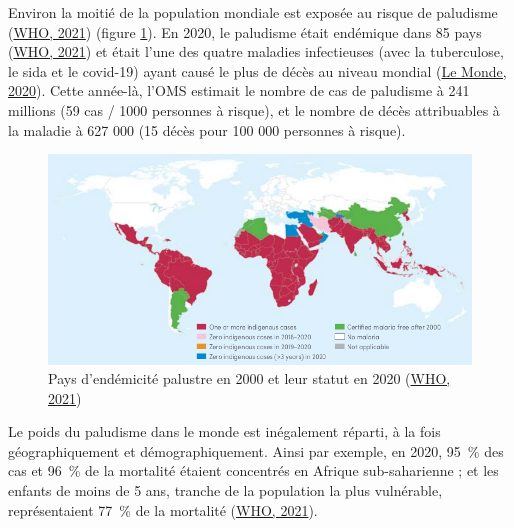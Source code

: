 \documentclass[12pt,twoside]{reedthesis}
\begin{document}
Environ la moitié de la population mondiale est exposée au risque de paludisme (\protect\hyperlink{ref-who_2021}{WHO, 2021}) (figure \ref{fig:map-global-malaria-countries}). En 2020, le paludisme était endémique dans 85 pays (\protect\hyperlink{ref-who_2021}{WHO, 2021}) et était l'une des quatre maladies infectieuses (avec la tuberculose, le sida et le covid-19) ayant causé le plus de décès au niveau mondial (\protect\hyperlink{ref-le_monde_covid-19_2020}{Le Monde, 2020}). Cette année-là, l'OMS estimait le nombre de cas de paludisme à 241 millions (59 cas / 1000 personnes à risque), et le nombre de décès attribuables à la maladie à 627 000 (15 décès pour 100 000 personnes à risque).\\
\begin{figure}

{\centering \includegraphics[width=0.9\linewidth]{figure/map_global_malaria_countries} 

}

\caption[Pays d'endémicité palustre en 2000 et leur statut en 2020]{Pays d'endémicité palustre en 2000 et leur statut en 2020 (\protect\hyperlink{ref-who_2021}{WHO, 2021})}\label{fig:map-global-malaria-countries}
\end{figure}
Le poids du paludisme dans le monde est inégalement réparti, à la fois géographiquement et démographiquement. Ainsi par exemple, en 2020, 95~\% des cas et 96~\% de la mortalité étaient concentrés en Afrique sub-saharienne ; et les enfants de moins de 5 ans, tranche de la population la plus vulnérable, représentaient 77~\% de la mortalité (\protect\hyperlink{ref-who_2021}{WHO, 2021}).\\
\end{document}
